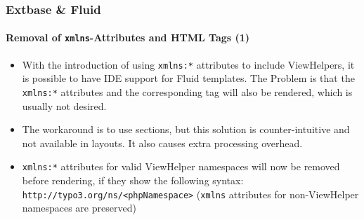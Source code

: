 \begin{frame}[fragile]
	\frametitle{Extbase \& Fluid}
	\framesubtitle{Removal of \texttt{xmlns}-Attributes and HTML Tags (1)}

	\lstset{basicstyle=\tiny\ttfamily}

	\begin{itemize}

		\item With the introduction of using \texttt{xmlns:*} attributes to include
			ViewHelpers, it is possible to have IDE support for Fluid templates.
			The Problem is that the \texttt{xmlns:*} attributes and the corresponding tag
			will also be rendered, which is usually not desired.

		\item The workaround is to use sections, but this solution is counter-intuitive
			and not available in layouts. It also causes extra processing overhead.

		\item \texttt{xmlns:*} attributes for valid ViewHelper namespaces will now be
			removed before rendering, if they show the following syntax:
			\small\texttt{http://typo3.org/ns/<phpNamespace>}\normalsize\newline
			(\texttt{xmlns} attributes for non-ViewHelper namespaces are preserved)

	\end{itemize}

\end{frame}


